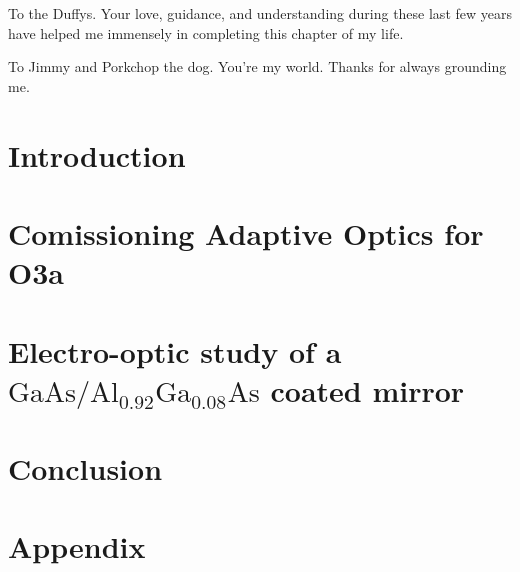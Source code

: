 \documentclass[12pt]{report}
\newcommand{\algaas}{\mathrm{Al_{0.92}Ga_{0.08}As}}
\newcommand{\gaas}{\mathrm{GaAs}}
\begin{document}
To the Duffys. Your love, guidance, and understanding during these last few years have helped me immensely in completing this chapter of my life.

To Jimmy and Porkchop the dog. You’re my world. Thanks for always grounding me.

\tableofcontents

\newpage


\chapter{Introduction}

\newpage

\chapter{Comissioning Adaptive Optics for O3a}

\newpage

\chapter{Electro-optic study of a \texorpdfstring{$\gaas / \algaas$}{gaas/algaas} coated mirror}

\newpage 

\chapter{Conclusion}

\newpage

\chapter{Appendix} \label{ch:appendix}




\end{document}
